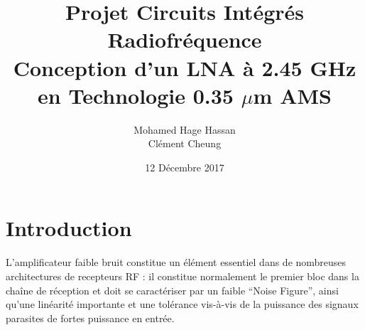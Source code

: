 \documentclass[a4paper]{article}
\begin{document}
\newcommand\textstyleEmphasis[1]{\textit{#1}}
\renewcommand{\contentsname}{Table des mati\`eres}
\renewcommand\refname{R\'ef\'erences}

\renewcommand{\abstractname}{Pr\'eambule}
\title{\textbf{Projet Circuits Int\'egr\'es Radiofr\'equence \\ Conception d'un LNA \`a 2.45 GHz \\ en Technologie 0.35 $\mu$m AMS}}
\author{Mohamed Hage Hassan \\ Cl\'ement Cheung}
\date{12 D\'ecembre 2017}
\maketitle
\thispagestyle{empty}

\tableofcontents
\clearpage

\section*{Introduction}

L'amplificateur faible bruit constitue un \'el\'ement essentiel dans de nombreuses architectures
de recepteurs RF : il constitue normalement le premier bloc dans la cha\^ine de r\'eception et
doit se caract\'eriser par un faible ``Noise Figure'', ainsi qu'une lin\'earit\'e importante et
une tol\'erance vis-\`a-vis de la puissance des signaux parasites de fortes puissance en entr\'ee.
\end{document}
